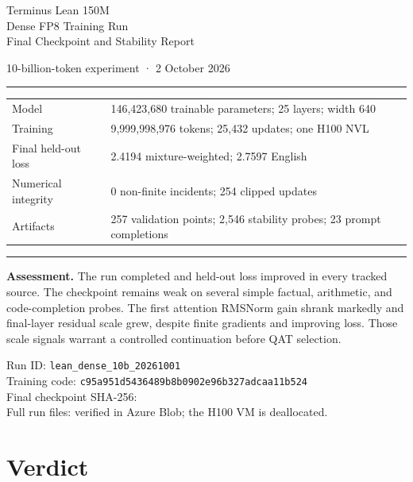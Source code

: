 \documentclass[10pt,a4paper]{article}
\begin{document}
\begin{titlepage}
\vspace*{19mm}
{\sffamily\color{TerminusBlue}\LARGE Terminus Lean 150M\\[4mm]
\Huge Dense FP8 Training Run\\[3mm]
\Large Final Checkpoint and Stability Report\par}
\vspace{14mm}
{\large 10-billion-token experiment · 2 October 2026\par}
\vspace{12mm}
\rule{\linewidth}{0.7pt}
\vspace{5mm}
\begin{tabularx}{\linewidth}{@{}lX@{}}
Model & 146,423,680 trainable parameters; 25 layers; width 640\\
Training & 9,999,998,976 tokens; 25,432 updates; one H100 NVL\\
Final held-out loss & 2.4194 mixture-weighted; 2.7597 English\\
Numerical integrity & 0 non-finite incidents; 254 clipped updates\\
Artifacts & 257 validation points; 2,546 stability probes; 23 prompt completions
\end{tabularx}
\vspace{5mm}
\rule{\linewidth}{0.7pt}
\vspace{12mm}
\textbf{Assessment.} The run completed and held-out loss improved in every
tracked source. The checkpoint remains weak on several simple factual, arithmetic,
and code-completion probes. The first attention RMSNorm gain shrank markedly and
final-layer residual scale grew, despite finite gradients and improving loss.
Those scale signals warrant a controlled continuation before QAT selection.
\par\vfill
{\small\color{TerminusGray}Run ID: \texttt{lean\_dense\_10b\_20261001}\\
Training code: \texttt{c95a951d5436489b8b0902e96b327adcaa11b524}\\
Final checkpoint SHA-256: \\
Full run files: verified in Azure Blob; the H100 VM is deallocated.}
\end{titlepage}
\tableofcontents
\clearpage
\section{Verdict}\label{verdict}
\end{document}
